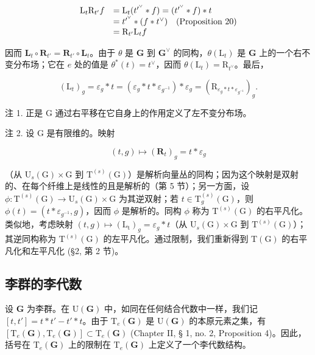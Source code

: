 \[
\begin{array}{r l} \mathrm{L} _ {t} \mathrm{R} _ {t ^ {\prime}} f & = \mathrm{L} _ {t} (t ^ {\prime^ {\vee}} * f) = (t ^ {\prime^ {\vee}} * f) * t \\ & = t ^ {\prime^ {\vee}} * (f * t ^ {\vee}) \quad \text {(Proposition 20)} \\ & = \mathrm{R} _ {t ^ {\prime}} \mathrm{L} _ {t} f \end{array}
\]

因而 \(\mathbf{L}_t\circ \mathbf{R}_{t'} = \mathbf{R}_{t'}\circ \mathbf{L}_t\)。由于 \(\theta\) 是 \(\mathbf{G}\) 到 \(\mathbf{G}^{\vee}\) 的同构，\(\theta (\mathrm{L}_t)\) 是 \(\mathbf{G}\) 上的一个右不变分布场；它在 \(e\) 处的值是 \(\theta^{*}(t) = t^{\vee}\)，因而 \(\theta (\mathrm{L}_t) = \mathrm{R}_{t^{\vee}}\)。最后，

\[
\left(\mathrm{L} _ {t}\right) _ {g} = \varepsilon_ {g} * t = \left(\varepsilon_ {g} * t * \varepsilon_ {g^{-1}}\right) * \varepsilon_ {g} = \left(\mathrm{R} _ {\varepsilon_ {g} * t * \varepsilon_ {g^{-1}}}\right) _ {g}.
\]

注 1. 正是 G 通过右平移在它自身上的作用定义了左不变分布场。

注 2. 设 G 是有限维的。映射

\[
(t, g) \mapsto (\mathbf {R} _ {t}) _ {g} = t * \varepsilon_ {g}
\]

（从 \(\mathrm{U}_{s}(\mathrm{G})\times\mathrm{G}\) 到 \(\mathrm{T}^{(s)}(\mathrm{G})\)）是解析向量丛的同构；因为这个映射是双射的、在每个纤维上是线性的且是解析的（第 5 节）；另一方面，设 \(\phi:\mathrm{T}^{(s)}(\mathrm{G})\to\mathrm{U}_{s}(\mathrm{G})\times\mathrm{G}\) 为其逆双射；若 \(t\in\mathrm{T}_{g}^{(s)}(\mathrm{G})\)，则 \(\phi(t)=(t*\varepsilon_{g^{-1}},g)\)，因而 \(\phi\) 是解析的。同构 \(\phi\) 称为 \(\mathrm{T}^{(s)}(\mathrm{G})\) 的右平凡化。类似地，考虑映射 \((t,g)\mapsto(\mathrm{L}_{\mathrm{t}})_{g}=\varepsilon_{g}*t\)（从 \(\mathrm{U}_{s}(\mathrm{G})\times\mathrm{G}\) 到 \(\mathrm{T}^{(s)}(\mathrm{G})\)）；其逆同构称为 \(\mathrm{T}^{(s)}(\mathrm{G})\) 的左平凡化。通过限制，我们重新得到 \(\mathrm{T}(\mathrm{G})\) 的右平凡化和左平凡化 (§2, 第 2 节)。

\subsection{李群的李代数}

设 \(\mathbf{G}\) 为李群。在 \(\mathrm{U}(\mathbf{G})\) 中，如同在任何结合代数中一样，我们记 \([t, t'] = t * t' - t' * t\)。由于 \(\mathrm{T}_{e}(\mathbf{G})\) 是 \(\mathrm{U}(\mathbf{G})\) 的本原元素之集，有 \([\mathrm{T}_{e}(\mathbf{G}), \mathrm{T}_{e}(\mathbf{G})] \subset \mathrm{T}_{e}(\mathbf{G})\) (Chapter II, § 1, no. 2, Proposition 4)。因此，括号在 \(\mathrm{T}_{e}(\mathbf{G})\) 上的限制在 \(\mathrm{T}_{e}(\mathbf{G})\) 上定义了一个李代数结构。

